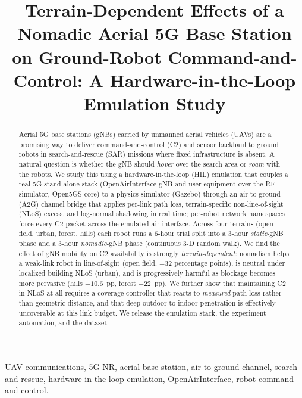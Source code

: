 \documentclass[conference]{IEEEtran}
\begin{document}
\title{Terrain-Dependent Effects of a Nomadic Aerial 5G Base Station on
Ground-Robot Command-and-Control: A Hardware-in-the-Loop Emulation Study}

\author{
}

\maketitle

\begin{abstract}
Aerial 5G base stations (gNBs) carried by unmanned aerial vehicles (UAVs) are a
promising way to deliver command-and-control (C2) and sensor backhaul to ground
robots in search-and-rescue (SAR) missions where fixed infrastructure is absent.
A natural question is whether the gNB should \emph{hover} over the search area or
\emph{roam} with the robots. We study this using a hardware-in-the-loop (HIL)
emulation that couples a real 5G stand-alone stack (OpenAirInterface gNB and user
equipment over the RF simulator, Open5GS core) to a physics simulator (Gazebo)
through an air-to-ground (A2G) channel bridge that applies per-link path loss,
terrain-specific non-line-of-sight (NLoS) excess, and log-normal shadowing in
real time; per-robot network namespaces force every C2 packet across the emulated
air interface. Across four terrains (open field, urban, forest, hills) each robot
runs a 6-hour trial split into a 3-hour \emph{static}-gNB phase and a 3-hour
\emph{nomadic}-gNB phase (continuous 3-D random walk). We find the effect of gNB
mobility on C2 availability is strongly \emph{terrain-dependent}: nomadism helps
a weak-link robot in line-of-sight (open field, $+32$ percentage points), is
neutral under localized building NLoS (urban), and is progressively harmful as
blockage becomes more pervasive (hills $-10.6$~pp, forest $-22$~pp). We further
show that maintaining C2 in NLoS at all requires a coverage controller that
reacts to \emph{measured} path loss rather than geometric distance, and that deep
outdoor-to-indoor penetration is effectively uncoverable at this link budget. We
release the emulation stack, the experiment automation, and the dataset.
\end{abstract}

\begin{IEEEkeywords}
UAV communications, 5G NR, aerial base station, air-to-ground channel,
search and rescue, hardware-in-the-loop emulation, OpenAirInterface, robot
command and control.
\end{IEEEkeywords}
\end{document}
